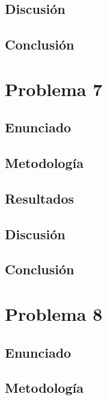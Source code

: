 \documentclass{article}
\begin{document}
\subsection{Discusión}

\subsection{Conclusión}

\section{Problema 7}

\subsection{Enunciado}

\subsection{Metodología}

\subsection{Resultados}
\setcounter{equation}{0}

\subsection{Discusión}

\subsection{Conclusión}

\section{Problema 8}

\subsection{Enunciado}

\subsection{Metodología}
\end{document}
